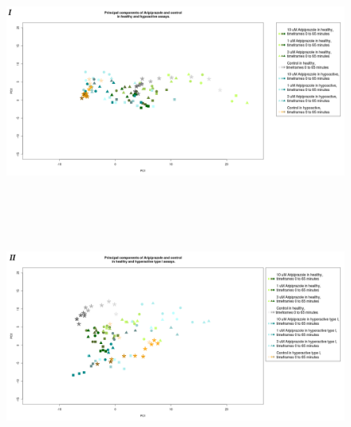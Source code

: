 \documentclass[a4paper,12pt]{article}
\begin{document}
\begin{figure}[h!]
\begin{center}
\includegraphics[width=16cm,height=8cm]{Aripiprazole_Control_DarkApoLow_turn_only_stratified.png}
\includegraphics[width=16cm,height=8cm]{Aripiprazole_Control_DarkApoHigh_turn_only_stratified.png}
\end{center}
\end{figure}
\newpage
\end{document}
